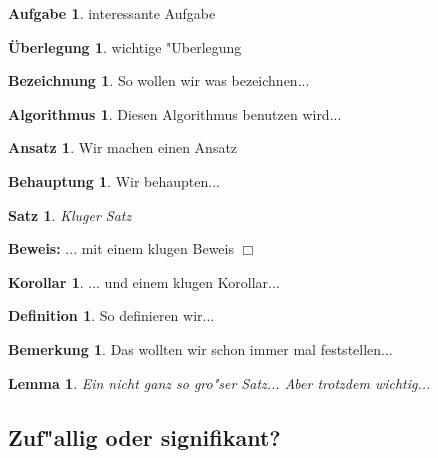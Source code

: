 \documentclass[10pt,a4paper, twoside]{article}
\theoremstyle{definition}
\newtheorem*{Aufgabe}{Aufgabe}
\newtheorem*{Ueberlegung}{\"Uberlegung}
\newtheorem*{Bezeichnung}{Bezeichnung}
\newtheorem*{Algorithmus}{Algorithmus}
\newtheorem*{Ansatz}{Ansatz}
\newtheorem*{Behauptung}{Behauptung}
\newtheorem{Korollar}{Korollar}[subsection]
\newtheorem{Definition}{Definition}[subsection]
\newtheorem{Bemerkung}{Bemerkung}[subsection]
\newenvironment{Beweis}{\noindent\textbf{Beweis:}}{\hfill $\Box$ }
\theoremstyle{plain}
\newtheorem{Satz}{Satz}[subsection]
\newtheorem{Lemma}{Lemma}[subsection]
\numberwithin{equation}{subsection}
\begin{document}
\begin{Aufgabe}
interessante Aufgabe
\end{Aufgabe}

\begin{Ueberlegung}
wichtige "Uberlegung
\end{Ueberlegung}

\begin{Bezeichnung}
So wollen wir was bezeichnen...
\end{Bezeichnung}

\begin{Algorithmus}
Diesen Algorithmus benutzen wird...
\end{Algorithmus}
\begin{Ansatz}
Wir machen einen Ansatz
\end{Ansatz}

\begin{Behauptung}
Wir behaupten...
\end{Behauptung}

\begin{Satz}
Kluger Satz
\end{Satz}
\begin{Beweis}
... mit einem klugen Beweis
\end{Beweis}
\begin{Korollar}
... und einem klugen Korollar...
\end{Korollar}

\begin{Definition}
So definieren wir...
\end{Definition}
\begin{Bemerkung}
Das wollten wir schon immer mal feststellen...
\end{Bemerkung}
\begin{Lemma}
Ein nicht ganz so gro"ser Satz... Aber trotzdem wichtig...
\end{Lemma}

 
\newpage

\subsection*{Zuf"allig oder signifikant?}

\setcounter{Beispiel}{0}
\setcounter{equation}{0}

\setcounter{Satz}{0}
\setcounter{Lemma}{0}
\setcounter{Korollar}{0}
\setcounter{Definition}{0}
\setcounter{Bemerkung}{0}
\end{document}

